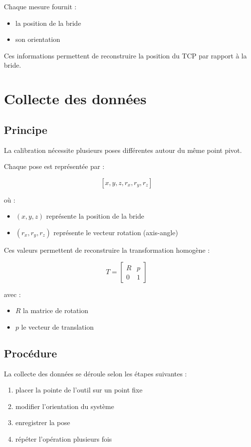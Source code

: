 \documentclass[a4paper,11pt]{article}
\begin{document}
Chaque mesure fournit :

\begin{itemize}
\item la position de la bride
\item son orientation
\end{itemize}

Ces informations permettent de reconstruire la position du TCP par rapport à la bride.

\section{Collecte des données}

\subsection{Principe}

La calibration nécessite plusieurs poses différentes autour du même point pivot.

Chaque pose est représentée par :

\[
[x,y,z,r_x,r_y,r_z]
\]

où :

\begin{itemize}
\item $(x,y,z)$ représente la position de la bride
\item $(r_x,r_y,r_z)$ représente le vecteur rotation (axis-angle)
\end{itemize}

Ces valeurs permettent de reconstruire la transformation homogène :

\[
T =
\begin{bmatrix}
R & p \\
0 & 1
\end{bmatrix}
\]

avec :

\begin{itemize}
\item $R$ la matrice de rotation
\item $p$ le vecteur de translation
\end{itemize}

\subsection{Procédure}

La collecte des données se déroule selon les étapes suivantes :

\begin{enumerate}
\item placer la pointe de l’outil sur un point fixe
\item modifier l’orientation du système
\item enregistrer la pose
\item répéter l’opération plusieurs fois
\end{enumerate}
\end{document}

